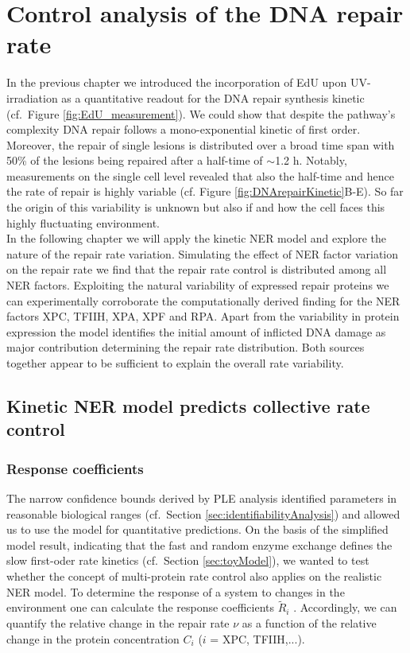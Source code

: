 \chapter{Control analysis of the DNA repair rate}

In the previous chapter we introduced the incorporation of EdU upon UV-irradiation as a quantitative readout for the DNA repair synthesis kinetic (cf.\ Figure \ref{fig:EdU_measurement}). We could show that despite the pathway's complexity DNA repair follows a mono-exponential kinetic of first order. Moreover, the repair of single lesions is distributed over a broad time span with 50\% of the lesions being repaired after a half-time of $\sim$1.2 h. Notably, measurements on the single cell level revealed that also the half-time and hence the rate of repair is highly variable (cf. Figure \ref{fig:DNArepairKinetic}B-E). So far the origin of this variability is unknown but also if and how the cell faces this highly fluctuating environment.\\  
In the following chapter we will apply the kinetic NER model and explore the nature of the repair rate variation. Simulating the effect of NER factor variation on the repair rate we find that the repair rate control is distributed among all NER factors. Exploiting the natural variability of expressed repair proteins we can experimentally corroborate the computationally derived finding for the NER factors XPC, TFIIH, XPA, XPF and RPA. Apart from the variability in protein expression the model identifies the initial amount of inflicted DNA damage as major contribution determining the repair rate distribution. Both sources together appear to be sufficient to explain the overall rate variability.     



\section{Kinetic NER model predicts collective rate control}

\subsection{Response coefficients}

The narrow confidence bounds derived by PLE analysis identified parameters in reasonable biological ranges (cf.\ Section \ref{sec:identifiabilityAnalysis}) and allowed us to use the model for quantitative predictions. On the basis of the simplified model result, indicating that the fast and random enzyme exchange defines the slow first-oder rate kinetics (cf.\ Section \ref{sec:toyModel}), we wanted to test whether the concept of multi-protein rate control also applies on the realistic NER model. To determine the response of a system to changes in the environment one can calculate the response coefficients $\tilde{R}_i$ \cite{Hofmeyr1991,Fell1992}. Accordingly, we can quantify the relative change in the repair rate $\nu$ as a function of the relative change in the protein concentration $C_i$ ($i$ = XPC, TFIIH,...).

